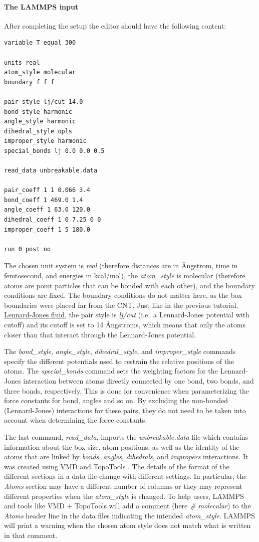 \documentclass[9pt,tutorial]{livecoms}
\begin{document}
\paragraph{The LAMMPS input}
After completing the setup the editor should have the following content:
\begin{lstlisting}
variable T equal 300

units real
atom_style molecular
boundary f f f

pair_style lj/cut 14.0
bond_style harmonic
angle_style harmonic
dihedral_style opls
improper_style harmonic
special_bonds lj 0.0 0.0 0.5

read_data unbreakable.data

pair_coeff 1 1 0.066 3.4
bond_coeff 1 469.0 1.4
angle_coeff 1 63.0 120.0
dihedral_coeff 1 0 7.25 0 0
improper_coeff 1 5 180.0

run 0 post no
\end{lstlisting}
The chosen unit system is \textit{real} (therefore distances are in
Ångstrom, time in femtosecond, and energies in kcal/mol), the
\textit{atom\_style} is molecular (therefore atoms are point particles
that can be bonded with each other), and the boundary conditions are
fixed.  The boundary conditions do not matter here, as the box
boundaries were placed far from the CNT.  Just like in the previous
tutorial, \hyperref[lennard-jones-label]{Lennard-Jones fluid}, the pair
style is \textit{lj/cut} (i.e.~a Lennard-Jones potential with cutoff)
and its cutoff is set to 14 Ångstroms, which means that only the atoms
closer than that interact through the Lennard-Jones potential.

The \textit{bond\_style}, \textit{angle\_style},
\textit{dihedral\_style}, and \textit{improper\_style} commands specify
the different potentials used to restrain the relative positions of the
atoms.  The \textit{special\_bonds} command sets the weighting factors
for the Lennard-Jones interaction between atoms directly connected by
one bond, two bonds, and three bonds, respectively.  This is done for
convenience when parameterizing the force constants for bond, angles and
so on.  By excluding the non-bonded (Lennard-Jones) interactions for
these pairs, they do not need to be taken into account when determining
the force constants.

The last command, \textit{read\_data}, imports the
\textit{unbreakable.data} file which contains information about the box
size, atom positions, as well as the identity of the atoms that are
linked by \textit{bonds}, \textit{angles}, \textit{dihedrals}, and
\textit{impropers} interactions.  It was created using VMD and TopoTools
\cite{kohlmeyer2017topotools}.  The details of the format of the
different sections in a data file change with different settings.  In
particular, the \textit{Atoms} section may have a different number of
columns or they may represent different properties when the
\textit{atom\_style} is changed.  To help users, LAMMPS and tools like
VMD + TopoTools will add a comment (here \textit{\# molecular}) to the
\textit{Atoms} header line in the data files indicating the intended
\textit{atom\_style}.  LAMMPS will print a warning when the chosen atom
style does not match what is written in that comment.
\end{document}
